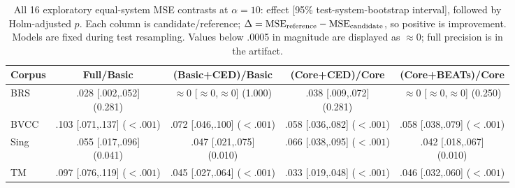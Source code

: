 \begin{table}[!t]
\caption{All 16 exploratory equal-system MSE contrasts at $\alpha=10$: effect [95\% test-system-bootstrap interval], followed by Holm-adjusted $p$. Each column is candidate/reference; $\Delta=\mathrm{MSE}_{\rm reference}-\mathrm{MSE}_{\rm candidate}$, so positive is improvement. Models are fixed during test resampling. Values below .0005 in magnitude are displayed as $\approx0$; full precision is in the artifact.}
\label{tab:planned}
\centering
\small
\setlength{\tabcolsep}{3pt}
\renewcommand{\arraystretch}{1.10}
\begin{tabular}{lcccc}
\toprule
Corpus & Full/Basic & (Basic+CED)/Basic & (Core+CED)/Core & (Core+BEATs)/Core \\
\midrule
BRS & \shortstack{.028 [.002,.052]\\(0.281)} & \shortstack{$\approx 0$ [$\approx 0$,$\approx 0$]\\(1.000)} & \shortstack{.038 [.009,.072]\\(0.281)} & \shortstack{$\approx 0$ [$\approx 0$,$\approx 0$]\\(0.250)} \\
BVCC & \shortstack{.103 [.071,.137]\\($<.001$)} & \shortstack{.072 [.046,.100]\\($<.001$)} & \shortstack{.058 [.036,.082]\\($<.001$)} & \shortstack{.058 [.038,.079]\\($<.001$)} \\
Sing & \shortstack{.055 [.017,.096]\\(0.041)} & \shortstack{.047 [.021,.075]\\(0.010)} & \shortstack{.066 [.038,.095]\\($<.001$)} & \shortstack{.042 [.018,.067]\\(0.010)} \\
TM & \shortstack{.097 [.076,.119]\\($<.001$)} & \shortstack{.045 [.027,.064]\\($<.001$)} & \shortstack{.033 [.019,.048]\\($<.001$)} & \shortstack{.046 [.032,.060]\\($<.001$)} \\
\bottomrule
\end{tabular}
\end{table}
